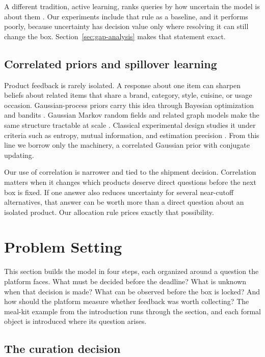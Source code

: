 \documentclass[11pt]{article}
\theoremstyle{definition}
\theoremstyle{remark}
\newcommand{\1}{\mathbf{1}}
\begin{document}
A different tradition, active learning, ranks queries by how uncertain
the model is about them \citep{Settles2009}. Our experiments include
that rule as a baseline, and it performs poorly, because uncertainty
has decision value only where resolving it can still change the box.
Section~\ref{sec:gap-analysis} makes that statement exact.

\subsection{Correlated priors and spillover learning}

Product feedback is rarely isolated. A response about one item can
sharpen beliefs about related items that share a brand, category,
style, cuisine, or usage occasion. Gaussian-process priors carry this
idea through Bayesian optimization and bandits
\citep{SrinivasEtAl,ContalEtAl,DesautelsEtAl,ValkoEtAl,KrauseGuestrin,Seeger}.
Gaussian Markov random fields and related graph models make the same
structure tractable at scale \citep{KondorLafferty,RueHeld,Lauritzen}.
Classical experimental design studies it under criteria such as
entropy, mutual information, and estimation precision
\citep{Pukelsheim}. From this line we borrow only the machinery, a
correlated Gaussian prior with conjugate updating.

Our use of correlation is narrower and tied to the shipment decision.
Correlation matters when it changes which products deserve direct
questions before the next box is fixed. If one answer also reduces
uncertainty for several near-cutoff alternatives, that answer can be
worth more than a direct question about an isolated product. Our
allocation rule prices exactly that possibility.

\section{Problem Setting}\label{sec:problem-setting}

This section builds the model in four steps, each organized around a
question the platform faces. What must be decided before the deadline?
What is unknown when that decision is made? What can be observed before
the box is locked? And how should the platform measure whether feedback
was worth collecting? The meal-kit example from the introduction runs through the section, and
each formal object is introduced where its question arises.

\subsection{The curation decision}\label{subsec:biz-data}
\end{document}
